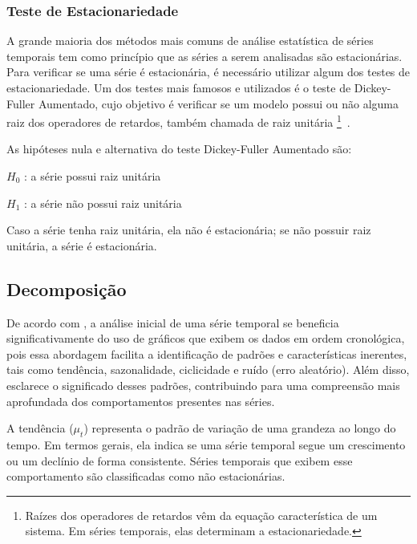     \subsubsection{Teste de Estacionariedade}
        A grande maioria dos métodos mais comuns de análise estatística de séries temporais tem como princípio que as séries 
        a serem analisadas são estacionárias. Para verificar se uma série é estacionária, é necessário utilizar algum dos testes 
        de estacionariedade. Um dos testes mais famosos e utilizados é o teste de Dickey-Fuller Aumentado, cujo objetivo é 
        verificar se um modelo possui ou não alguma raiz dos operadores de retardos, também chamada de raiz unitária
        \footnote{Raízes dos operadores de retardos vêm da equação característica de um sistema. Em séries temporais, elas 
        determinam a estacionariedade.}~\cite{costa2019}.

        As hipóteses nula e alternativa do teste Dickey-Fuller Aumentado são:

        \begin{center}
            \(H_0\) : a série possui raiz unitária

            \(H_1\) : a série não possui raiz unitária
        \end{center}

        Caso a série tenha raiz unitária, ela não é estacionária; se não possuir raiz unitária, a série é estacionária.
    \subsection{Decomposição}

        De acordo com , a análise inicial de uma série temporal se beneficia 
        significativamente do uso de gráficos que exibem os dados em ordem cronológica, pois essa abordagem 
        facilita a identificação de padrões e características inerentes, tais como tendência, sazonalidade, 
        ciclicidade e ruído (erro aleatório). Além disso,  esclarece o significado 
        desses padrões, contribuindo para uma compreensão mais aprofundada dos comportamentos presentes nas 
        séries.
        
        A tendência ($\mu_t$) representa o padrão de variação de uma grandeza ao longo do tempo. Em termos gerais, ela indica se 
        uma série temporal segue um crescimento ou um declínio de forma consistente. Séries temporais que exibem esse comportamento 
        são classificadas como não estacionárias.

